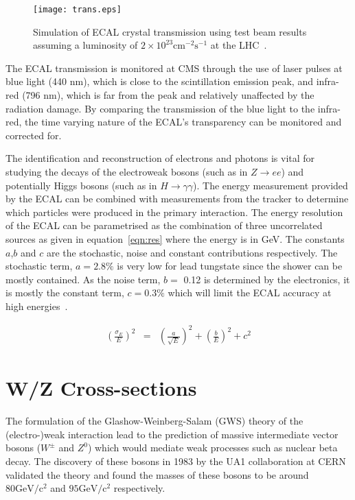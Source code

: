 \documentclass[a4paper,10pt]{article}
\begin{document}
\begin{figure}[!ht]
			\centering
			\texttt{[image: trans.eps]}
			\caption{Simulation of ECAL crystal transmission using test beam results assuming a luminosity of $2 \times 10^23 \mathrm{cm^{-2}s^{-1}}$ at the LHC~\cite{cmsdetector}.}
\label{fig:trans}
\end{figure}


The ECAL transmission is monitored at CMS through the use of laser pulses at blue light (440 nm), which is close to the scintillation emission peak,
and infra-red (796 nm), which is far from the peak and relatively unaffected by the radiation damage. By comparing the transmission of the blue light to the infra-red, the time varying nature of the ECAL's
transparency can be monitored and corrected for.

The identification and reconstruction of electrons and photons is vital for studying the decays of the electroweak bosons (such as in $Z\rightarrow e e$) and potentially Higgs bosons (such as in $H \rightarrow
 \gamma \gamma$). The energy measurement provided by the ECAL can be combined with measurements from the tracker to determine which particles were produced in the primary interaction. 
The energy resolution of the ECAL can be parametrised as the combination of three uncorrelated sources as given in equation~\ref{eqn:res} where the energy is in GeV. 
The constants $a$,$b$ and $c$ are the stochastic, noise and constant contributions respectively. The stochastic term, $a=2.8\%$ is very low for lead tungstate since the shower can be mostly contained.
As the noise term, $b=$ 0.12 is determined by the electronics, it is mostly the constant term, $c=0.3\%$ which will limit the ECAL accuracy at high energies~\cite{cmsdetector}. 

\begin{eqnarray}
  \left( \frac{\displaystyle \sigma_{E}}{\displaystyle E} \right)^ 2 & = & \left( \frac{\displaystyle a}{\displaystyle \sqrt{E}} \right)^ 2 
  + \left( \frac{\displaystyle b}{\displaystyle {E}} \right)^ 2 + c^ 2
\end{eqnarray}
\label{eqn:res}

 

\section{W/Z Cross-sections}

The formulation of the Glashow-Weinberg-Salam (GWS) theory of the (electro-)weak interaction lead to the prediction of massive intermediate vector bosons ($W^{\pm}$ and $Z^0$) which would mediate
weak processes such as nuclear beta decay. The discovery of these bosons in 1983 by the UA1 collaboration at CERN~\cite{UA1W,UA1Z} validated the theory and found the masses of these bosons to be around
$80 \mathrm{GeV/c^2 }$ and $95 \mathrm{GeV/c^2 }$ respectively.
\end{document}
